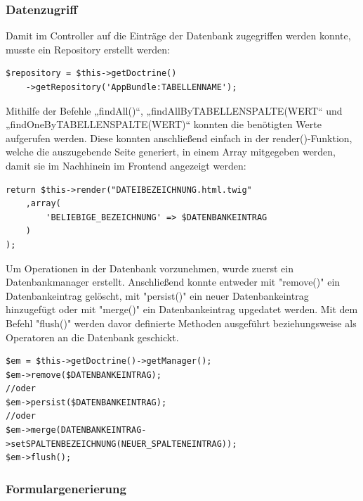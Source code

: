     \subsubsection{Datenzugriff}

Damit im Controller auf die Einträge der Datenbank zugegriffen werden konnte, musste ein Repository erstellt werden:
	\lstset{language=php}
  	\begin{lstlisting}
$repository = $this->getDoctrine()
    ->getRepository('AppBundle:TABELLENNAME');
  	\end{lstlisting}
Mithilfe der Befehle „findAll()“, „findAllByTABELLENSPALTE(WERT“ und „findOneByTABELLENSPALTE(WERT)“ konnten die benötigten Werte aufgerufen werden.
Diese konnten anschließend einfach in der render()-Funktion, welche die auszugebende Seite generiert, in einem Array mitgegeben werden, damit sie im Nachhinein im Frontend angezeigt werden:
	\lstset{language=php}
  	\begin{lstlisting}
return $this->render("DATEIBEZEICHNUNG.html.twig"
    ,array(
    	'BELIEBIGE_BEZEICHNUNG' => $DATENBANKEINTRAG
    )
);
  	\end{lstlisting}
Um Operationen in der Datenbank vorzunehmen, wurde zuerst ein Datenbankmanager erstellt. Anschließend konnte entweder mit "remove()" ein Datenbankeintrag gelöscht, mit "persist()" ein neuer Datenbankeintrag hinzugefügt oder mit "merge()" ein Datenbankeintrag upgedatet werden. Mit dem Befehl "flush()" werden davor definierte Methoden ausgeführt beziehungsweise als Operatoren an die Datenbank geschickt.

	\lstset{language=php}
  	\begin{lstlisting}
$em = $this->getDoctrine()->getManager();
$em->remove($DATENBANKEINTRAG);
//oder
$em->persist($DATENBANKEINTRAG);
//oder
$em->merge(DATENBANKEINTRAG->setSPALTENBEZEICHNUNG(NEUER_SPALTENEINTRAG));
$em->flush();
  	\end{lstlisting}


    \subsubsection{Formulargenerierung}

